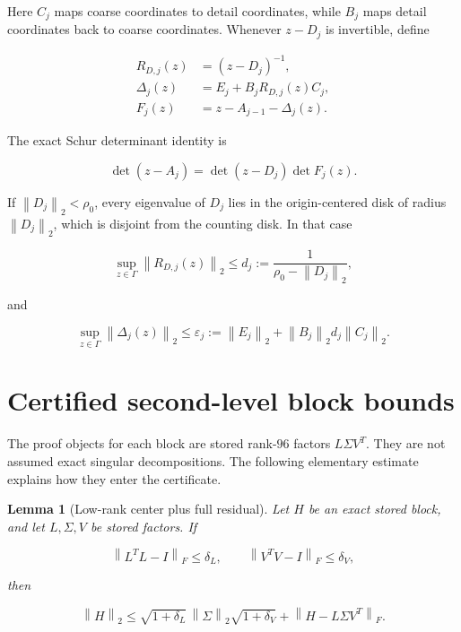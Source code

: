 \documentclass[11pt]{article}
\newtheorem{lemma}[theorem]{Lemma}
\theoremstyle{definition}
\theoremstyle{remark}
\newcommand{\norm}[1]{\left\lVert #1\right\rVert}
\newcommand{\eps}{\varepsilon}
\begin{document}
Here $C_j$ maps coarse coordinates to detail coordinates, while $B_j$
maps detail coordinates back to coarse coordinates.  Whenever
$z-D_j$ is invertible, define

\begin{align}
 R_{D,j}(z)&=(z-D_j)^{-1},\label{eq:detail-resolvent}\\
 \Delta_j(z)&=E_j+B_jR_{D,j}(z)C_j,\label{eq:self-energy}\\
 F_j(z)&=z-A_{j-1}-\Delta_j(z).\label{eq:effective}
\end{align}

The exact Schur determinant identity is

\begin{equation}
 \det(z-A_j)=\det(z-D_j)\det F_j(z).
 \label{eq:schur-determinant}
\end{equation}

If \(\norm{D_j}_2<\rho_0\), every eigenvalue of $D_j$ lies in the
origin-centered disk of radius \(\norm{D_j}_2\), which is disjoint from the
counting disk.  In that case

\begin{equation}
 \sup_{z\in\Gamma}\norm{R_{D,j}(z)}_2
 \le d_j:=\frac{1}{\rho_0-\norm{D_j}_2},
 \label{eq:detail-bound}
\end{equation}

and

\begin{equation}
 \sup_{z\in\Gamma}\norm{\Delta_j(z)}_2
 \le \eps_j:=\norm{E_j}_2+
 \norm{B_j}_2d_j\norm{C_j}_2.
 \label{eq:epsilon}
\end{equation}

\section{Certified second-level block bounds}
\label{sec:blocks}

The proof objects for each block are stored rank-$96$ factors
$L\Sigma V^T$.  They are not assumed exact singular decompositions.  The
following elementary estimate explains how they enter the certificate.

\begin{lemma}[Low-rank center plus full residual]
\label{lem:low-rank}
Let $H$ be an exact stored block, and let $L,\Sigma,V$ be stored factors.
If

\[
\norm{L^TL-I}_F\le\delta_L,
\qquad
\norm{V^TV-I}_F\le\delta_V,
\]

then

\begin{equation}
 \norm{H}_2\le
 \sqrt{1+\delta_L}\,\norm{\Sigma}_2\sqrt{1+\delta_V}
 +\norm{H-L\Sigma V^T}_F.
 \label{eq:low-rank-bound}
\end{equation}
\end{lemma}
\end{document}

